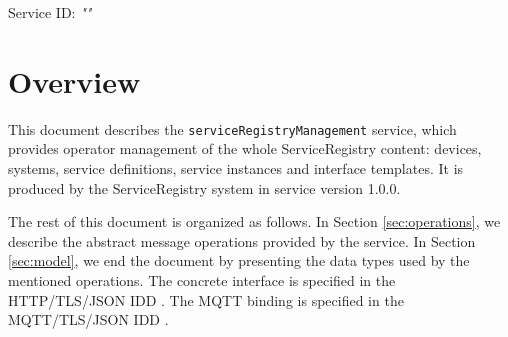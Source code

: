\documentclass[a4paper]{arrowhead}
\begin{document}
\sloppy

\ArrowheadSetup

\begin{center}
  \vspace*{1cm}
  \huge{\arrowtitle}

  \vspace*{0.2cm}
  \LARGE{\arrowtype}
  \vspace*{1cm}

  \Large{Service ID: \textit{"\arrowid"}}

  \vspace*{\fill}


  \vspace*{1cm}
  \vspace*{\fill}

  \begin{abstract}
    This document describes the \texttt{service\allowbreak{}Registry\allowbreak{}Management} service, version 1.0.0, produced by the ServiceRegistry core system of Arrowhead 5.2.2.
  \end{abstract}

  \vspace*{1cm}
\end{center}

\newpage

\tableofcontents
\newpage

\section{Overview}
\label{sec:overview}

This document describes the \texttt{service\allowbreak{}Registry\allowbreak{}Management} service, which provides operator management of the whole ServiceRegistry content: devices, systems, service definitions, service instances and interface templates.
It is produced by the ServiceRegistry system \cite{sr-sysd} in service version 1.0.0.

The rest of this document is organized as follows.
In Section \ref{sec:operations}, we describe the abstract message operations provided by the service.
In Section \ref{sec:model}, we end the document by presenting the data types used by the mentioned operations.
The concrete interface is specified in the HTTP/TLS/JSON IDD \cite{sr-serviceRegistryManagement-http-idd}. The MQTT binding is specified in the MQTT/TLS/JSON IDD \cite{sr-serviceRegistryManagement-mqtt-idd}.
\end{document}
